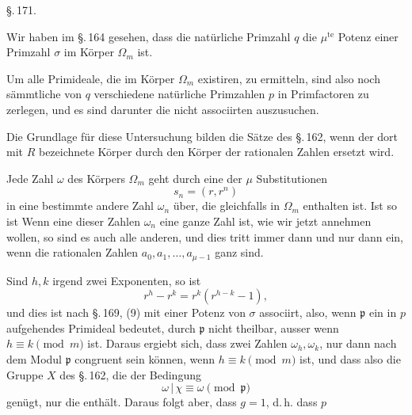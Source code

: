 \begin{center}
\S.\,171.

\end{center}

Wir haben im \S.\,164 gesehen, dass die nat\"urliche Primzahl $q$
die $\mu^{\text{te}}$ Potenz einer Primzahl $\sigma$ im K\"orper $\Omega_m$ ist.

Um alle Primideale, die im K\"orper $\Omega_m$ existiren, zu ermitteln, sind also noch s\"ammtliche von $q$ verschiedene nat\"urliche
Primzahlen $p$ in Primfactoren zu zerlegen, und es sind darunter
die nicht associirten auszusuchen.

Die Grundlage f\"ur diese Untersuchung bilden die S\"atze des
\S.\,162, wenn der dort mit $R$ bezeichnete K\"orper durch den
K\"orper der rationalen Zahlen ersetzt wird.

Jede Zahl $\omega$ des K\"orpers $\Omega_m$ geht durch eine der $\mu$ Substitutionen
\[
s_n = (r, r^n)
\]
in eine bestimmte andere Zahl $\omega_n$ \"uber, die gleichfalls in $\Omega_m$
enthalten ist. Ist
so ist
Wenn eine dieser Zahlen $\omega_n$ eine ganze Zahl ist, wie wir
jetzt annehmen wollen, so sind es auch alle anderen, und dies
tritt immer dann und nur dann ein, wenn die rationalen Zahlen
$a_0, a_1, \ldots, a_{\mu-1}$ ganz sind.

Sind $h, k$ irgend zwei Exponenten, so ist
\[
r^h - r^k = r^k(r^{h-k} - 1),
\]
und dies ist nach \S.\,169, (9) mit einer Potenz von $\sigma$ associirt,
also, wenn $\mathfrak{p}$ ein in $p$ aufgehendes Primideal bedeutet, durch $\mathfrak{p}$
nicht theilbar, ausser wenn $h \equiv k \pmod{m}$ ist. Daraus ergiebt
sich, dass zwei Zahlen $\omega_h, \omega_k$, nur dann nach dem Modul $\mathfrak{p}$ congruent sein k\"onnen, wenn $h \equiv k \pmod{m}$ ist, und dass also die
Gruppe $X$ des \S.\,162, die der Bedingung
\[
\omega\,|\,\chi \equiv \omega \pmod{\mathfrak{p}}
\]
gen\"ugt, nur die  enth\"alt. Daraus folgt
aber, dass $g = 1$, d.\,h. dass $p$ 
